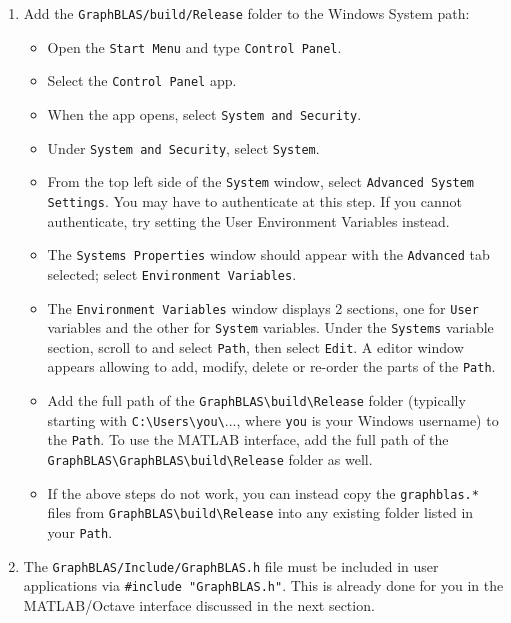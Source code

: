 \begin{enumerate}
\item Add the \verb'GraphBLAS/build/Release' folder to the Windows System path:

    \begin{itemize}
    \item Open the \verb'Start Menu' and type \verb'Control Panel'.
    \item Select the \verb'Control Panel' app.
    \item When the app opens, select \verb'System and Security'.
    \item Under \verb'System and Security', select \verb'System'.
    \item From the top left side of the \verb'System' window, select
        \verb'Advanced System Settings'.  You may have to authenticate
        at this step.
        If you cannot authenticate, try setting the User Environment Variables
        instead.
    \item The \verb'Systems Properties' window should appear with the
        \verb'Advanced' tab selected;
        select \verb'Environment Variables'.
    \item The \verb'Environment Variables' window displays 2 sections, one for
        \verb'User' variables and the other for \verb'System' variables.  Under
        the \verb'Systems' variable section, scroll to and select \verb'Path',
        then select \verb'Edit'.   A editor window appears allowing to add,
        modify, delete or re-order the parts of the \verb'Path'.
    \item Add the full path of the \verb'GraphBLAS\build\Release' folder
        (typically starting with \verb'C:\Users\you\'..., where \verb'you' is
        your Windows username) to the \verb'Path'.
        To use the MATLAB interface, add
        the full path of the \verb'GraphBLAS\GraphBLAS\build\Release' folder
        as well.
    \item If the above steps do not work, you can instead copy the
        \verb'graphblas.*' files from \verb'GraphBLAS\build\Release' into any
        existing folder listed in your \verb'Path'.
    \end{itemize}

\item The \verb'GraphBLAS/Include/GraphBLAS.h' file must be included in user
    applications via \verb'#include "GraphBLAS.h"'.  This is already done for
    you in the MATLAB/Octave interface discussed in the next section.

\end{enumerate}

